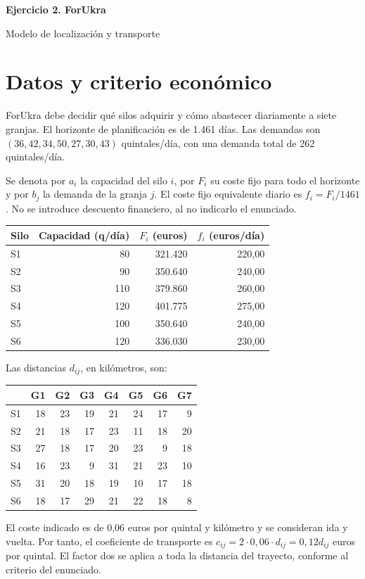 \documentclass[11pt,a4paper]{article}
\begin{document}
\begin{center}{\Large\bfseries Ejercicio 2. ForUkra}\par
Modelo de localización y transporte\end{center}
\section*{Datos y criterio económico}
ForUkra debe decidir qué silos adquirir y cómo abastecer diariamente a siete granjas.
El horizonte de planificación es de 1.461 días. Las demandas son
$(36,42,34,50,27,30,43)$ quintales/día, con una demanda total de 262 quintales/día.

Se denota por $a_i$ la capacidad del silo $i$, por $F_i$ su coste fijo para todo el
horizonte y por $b_j$ la demanda de la granja $j$. El coste fijo equivalente diario
es $f_i=F_i/1461$. No se introduce descuento financiero, al no indicarlo el enunciado.

\begin{center}\begin{tabular}{lrrr}\toprule
Silo & Capacidad (q/día) & $F_i$ (euros) & $f_i$ (euros/día) \\\midrule
S1 & 80 & 321.420 & 220,00 \\
S2 & 90 & 350.640 & 240,00 \\
S3 & 110 & 379.860 & 260,00 \\
S4 & 120 & 401.775 & 275,00 \\
S5 & 100 & 350.640 & 240,00 \\
S6 & 120 & 336.030 & 230,00 \\
\bottomrule\end{tabular}\end{center}
Las distancias $d_{ij}$, en kilómetros, son:
\begin{center}\begin{tabular}{lrrrrrrr}\toprule
 & G1 & G2 & G3 & G4 & G5 & G6 & G7 \\\midrule
S1 & 18 & 23 & 19 & 21 & 24 & 17 & 9 \\
S2 & 21 & 18 & 17 & 23 & 11 & 18 & 20 \\
S3 & 27 & 18 & 17 & 20 & 23 & 9 & 18 \\
S4 & 16 & 23 & 9 & 31 & 21 & 23 & 10 \\
S5 & 31 & 20 & 18 & 19 & 10 & 17 & 18 \\
S6 & 18 & 17 & 29 & 21 & 22 & 18 & 8 \\
\bottomrule\end{tabular}\end{center}
El coste indicado es de 0,06 euros por quintal y kilómetro y se consideran ida y vuelta.
Por tanto, el coeficiente de transporte es $c_{ij}=2\cdot0{,}06\cdot d_{ij}=0{,}12d_{ij}$
euros por quintal. El factor dos se aplica a toda la distancia del trayecto, conforme
al criterio del enunciado.
\end{document}
